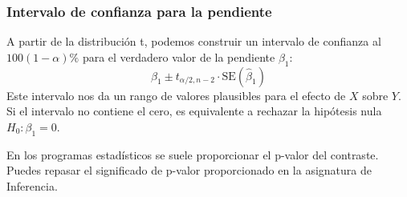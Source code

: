 \documentclass[
  letterpaper,
  DIV=11,
  numbers=noendperiod]{scrreprt}
\begin{document}
\subsubsection{Intervalo de confianza para la
pendiente}\label{intervalo-de-confianza-para-la-pendiente}

A partir de la distribución t, podemos construir un intervalo de
confianza al \(100(1-\alpha)\%\) para el verdadero valor de la pendiente
\(\beta_1\): \[
\hat{\beta}_1 \pm t_{\alpha/2, n-2} \cdot \text{SE}(\hat{\beta}_1)
\] Este intervalo nos da un rango de valores plausibles para el efecto
de \(X\) sobre \(Y\). Si el intervalo no contiene el cero, es
equivalente a rechazar la hipótesis nula \(H_0: \beta_1 = 0\).

\begin{tcolorbox}[enhanced jigsaw, leftrule=.75mm, breakable, colbacktitle=quarto-callout-important-color!10!white, bottomrule=.15mm, colframe=quarto-callout-important-color-frame, toprule=.15mm, colback=white, coltitle=black, bottomtitle=1mm, left=2mm, title=\textcolor{quarto-callout-important-color}{\faExclamation}\hspace{0.5em}{Para recordar}, opacityback=0, arc=.35mm, opacitybacktitle=0.6, toptitle=1mm, titlerule=0mm, rightrule=.15mm]

En los programas estadísticos se suele proporcionar el p-valor del
contraste. Puedes repasar el significado de p-valor proporcionado en la
asignatura de Inferencia.

\end{tcolorbox}
\end{document}
